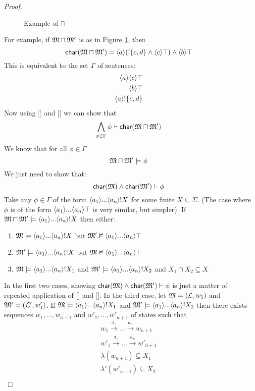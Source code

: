 \begin{proof}
\begin{figure}[H]
\begin{tikzpicture}[node distance=1.3cm,>=stealth',bend angle=45,auto]
\end{tikzpicture}
\caption{Example of $\sqcap$}
\label{setofpaths}
\end{figure}
For example, if $\MMM \sqcap \MMM'$ is as in Figure \ref{setofpaths}, then 
\[
\CHAR{\MMM \sqcap \MMM'} = \MAY{a}(\fBang \{c,d\} \land \MAY{c} \top) \land \MAY{b} \top
\]
This is equivalent to the set $\Gamma$ of sentences:
\begin{eqnarray*}
\MAY{a}\MAY{c} \top \\
\MAY{b} \top \\
\MAY{a}\fBang\{c,d\}
\end{eqnarray*}
Now using [] and [] we can show that
\[
\bigwedge_{\phi \in \Gamma} \phi \judge \CHAR{\MMM \sqcap \MMM'}
\]
We know that for all $\phi \in \Gamma$
\[
\MMM \sqcap \MMM' \models \phi
\]
We just need to show that:
\[
\CHAR{\MMM} \land \CHAR{\MMM'} \judge \phi
\]
Take any $\phi \in \Gamma$ of the form $\MAY{a_1} ... \MAY{a_n} ! X$ for some finite $X \subseteq \Sigma$. (The case where $\phi$ is of the form $\MAY{a_1} ... \MAY{a_n} \top$ is very similar, but simpler).
If $\MMM \sqcap \MMM' \models \MAY{a_1} ... \MAY{a_n} ! X$ then either:
\begin{enumerate}
\item
$\MMM \models \MAY{a_1} ... \MAY{a_n} ! X$ but $\MMM' \nvDash \MAY{a_1} ... \MAY{a_n} \top$
\item
$\MMM' \models \MAY{a_1} ... \MAY{a_n} ! X$ but $\MMM \nvDash \MAY{a_1} ... \MAY{a_n} \top$
\item
$\MMM \models \MAY{a_1} ... \MAY{a_n} ! X_1$ and $\MMM' \models \MAY{a_1} ... \MAY{a_n} ! X_2$ and $X_1 \cap X_2 \subseteq X$
\end{enumerate}
In the first two cases, showing $\CHAR{\MMM} \land \CHAR{\MMM'} \judge \phi$ is just a matter of repeated application of   [] and [].
In the third case, let $\MMM = (\mathcal{L}, w_1)$ and $\MMM' = (\mathcal{L}', w'_1)$.
If $\MMM \models \MAY{a_1} ... \MAY{a_n} ! X_1$ and $\MMM' \models \MAY{a_1} ... \MAY{a_n} ! X_2$ then there exists sequences $w_1, ..., w_{n+1}$ and $w'_1, ..., w'_{n+1}$ of states such that
\begin{eqnarray*}
w_1 \xrightarrow{a_1} ... \xrightarrow{a_n} w_{n+1} \\
w'_1 \xrightarrow{a_1} ... \xrightarrow{a_n} w'_{n+1} \\
\lambda(w_{n+1}) \subseteq X_1 \\
\lambda'(w'_{n+1}) \subseteq X_2 \\

\end{eqnarray*}
\end{proof}
